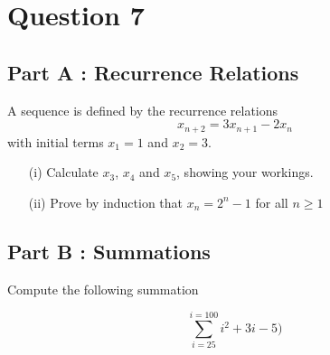 \documentclass[12pt]{report}
\begin{document}
\section*{Question 7}
\subsection*{Part A : Recurrence Relations}
A sequence is defined by the recurrence relations
 \[x_{n+2}  = 3x_{n+1} - 2x_n\]
with initial terms $x_1 = 1$ and $x_2=3$.

\begin{itemize}
\item[(i)] Calculate $x_3$, $x_4$ and $x_5$, showing your workings.
\item[(ii)] Prove by induction that $x_n = 2^n - 1$ for all $n \geq 1$
\end{itemize}

\subsection*{Part B : Summations}

Compute the following summation

\[ \sum^{i=100}_{i=25} i^2 + 3i -5)\]
\end{document}
